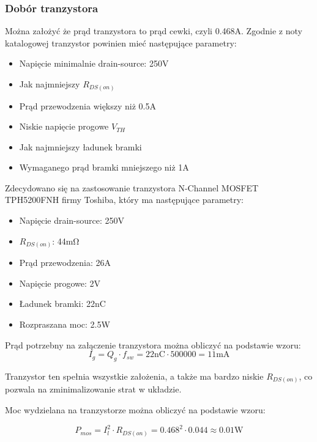 \documentclass[../../main.tex]{subfiles}
\begin{document}
\subsubsection{Dobór tranzystora}
Można założyć że prąd tranzystora to prąd cewki, czyli 0.468\si{\ampere}.
Zgodnie z noty katalogowej tranzystor powinien mieć następujące parametry:
\begin{itemize}
    \item Napięcie minimalnie drain-source: 250\si{\volt}
    \item Jak najmniejszy $R_{DS(on)}$
    \item Prąd przewodzenia większy niż 0.5\si{\ampere}
    \item Niskie napięcie progowe $V_{TH}$
    \item Jak najmniejszy ładunek bramki
    \item Wymaganego prąd bramki mniejszego niż 1\si{\ampere}
\end{itemize}
\newpage
Zdecydowano się na zastosowanie tranzystora N-Channel
MOSFET TPH5200FNH firmy Toshiba, który ma następujące parametry:
\begin{itemize}
    \item Napięcie drain-source: 250\si{\volt}
    \item $R_{DS(on)}$: 44\si{\milli\ohm}
    \item Prąd przewodzenia: 26\si{\ampere}
    \item Napięcie progowe: 2\si{\volt}
    \item Ładunek bramki: 22\si{\nano\coulomb}
    \item Rozpraszana moc: 2.5\si{\watt}
\end{itemize}

Prąd potrzebny na załączenie tranzystora można obliczyć na podstawie wzoru:
\begin{equation}
    I_{g} = Q_{g} \cdot f_{sw} = 22\si{\nano\coulomb} \cdot 500000 = 11\si{\milli\ampere}
\end{equation}


Tranzystor ten spełnia wszystkie założenia, a także ma bardzo niskie $R_{DS(on)}$, co pozwala na zminimalizowanie strat w układzie.

Moc wydzielana na tranzystorze można obliczyć na podstawie wzoru:

\begin{equation}
    P_{mos} = I_{l}^2 \cdot R_{DS(on)} = 0.468^2 \cdot 0.044 \approx 0.01\si{\watt}
\end{equation}
\end{document}

